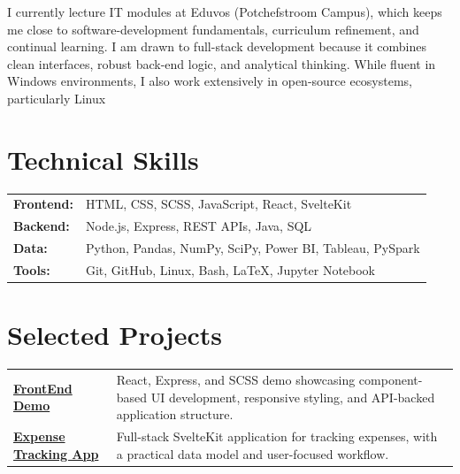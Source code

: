 \documentclass[a4paper,10pt]{article}
\begin{document}
I currently lecture IT modules at Eduvos (Potchefstroom Campus), which keeps me close to software-development fundamentals, curriculum refinement, and continual learning. I am drawn to full-stack development because it combines clean interfaces, robust back-end logic, and analytical thinking. While fluent in Windows environments, I also work extensively in open-source ecosystems, particularly Linux~\faLinux{\vspace*{2pt}}

\section*{Technical Skills}
\begin{tabularx}{\textwidth}{@{}l X@{}}
	\textbf{Frontend:} & HTML, CSS, SCSS, JavaScript, React, SvelteKit \\
	\textbf{Backend:} & Node.js, Express, REST APIs, Java, SQL \\
	\textbf{Data:} & Python, Pandas, NumPy, SciPy, Power BI, Tableau, PySpark \\
	\textbf{Tools:} & Git, GitHub, Linux, Bash, \LaTeX, Jupyter Notebook \\
\end{tabularx}

\section*{Selected Projects}
\begin{tabularx}{\textwidth}{@{}p{} X@{}}
	\textbf{\href{https://coalition-fed.onrender.com/}{FrontEnd Demo}} \href{https://github.com/HenriBranken/coalition-fed}{\textcolor{teal}{\faGithub}} &
	React, Express, and SCSS demo showcasing component-based UI development, responsive styling, and API-backed application structure. \\
	\textbf{\href{https://expense-tracker-five-sepia.vercel.app/}{Expense Tracking App}} \href{https://github.com/HenriBranken/expense-tracker}{\textcolor{teal}{\faGithub}} &
	Full-stack SvelteKit application for tracking expenses, with a practical data model and user-focused workflow. \\
\end{tabularx}
\end{document}
